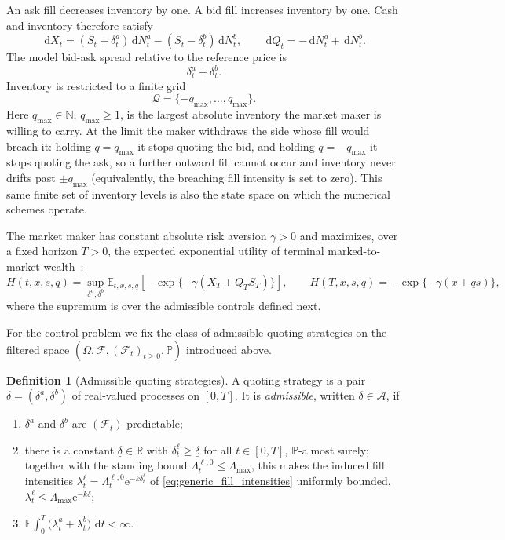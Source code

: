 \documentclass[11pt,a4paper]{article}
\newcommand{\E}{\mathbb{E}}
\newcommand{\Prob}{\mathbb{P}}
\newcommand{\R}{\mathbb{R}}
\newcommand{\Qcal}{\mathcal{Q}}
\newcommand{\Acal}{\mathcal{A}}
\newcommand{\Fcal}{\mathcal{F}}
\newcommand{\dd}{\,\mathrm{d}}
\newcommand{\e}{\mathrm e}
\theoremstyle{plain}
\theoremstyle{definition}
\newtheorem{definition}{Definition}[section]
\begin{document}
An ask fill decreases inventory by one.  A bid fill increases inventory by
one.  Cash and inventory therefore satisfy
\begin{equation}
\dd X_t=(S_t+\delta_t^a)\dd N_t^a
       -(S_t-\delta_t^b)\dd N_t^b,
\qquad
\dd Q_t=-\dd N_t^a+\dd N_t^b .
\label{eq:cash_inventory}
\end{equation}
The model bid-ask spread relative to the reference price is
\[
\delta_t^a + \delta_t^b .
\]
Inventory is restricted to a finite grid
\[
\Qcal=\{-q_{\max},\ldots,q_{\max}\}.
\]
Here \(q_{\max}\in\mathbb N\), \(q_{\max}\ge1\), is the largest absolute
inventory the market maker is willing
to carry. At the limit the maker withdraws the side whose fill would breach
it: holding \(q=q_{\max}\) it stops quoting the bid, and holding
\(q=-q_{\max}\) it stops quoting the ask, so a further outward fill cannot
occur and inventory never drifts past \(\pm q_{\max}\) (equivalently, the
breaching fill intensity is set to zero).  This
same finite set of inventory levels is also the state space on which the
numerical schemes operate.

The market maker has constant absolute risk aversion \(\gamma>0\) and
maximizes, over a fixed horizon \(T>0\), the expected exponential utility of
terminal marked-to-market wealth~\cite{AvellanedaStoikov2008}:
\begin{equation}
H(t,x,s,q)
=
\sup_{\delta^a,\delta^b}
\E_{t,x,s,q}
\left[-\exp\{-\gamma(X_T+Q_TS_T)\}\right],
\qquad
H(T,x,s,q)=-\exp\{-\gamma(x+qs)\},
\label{eq:as_objective}
\end{equation}
where the supremum is over the admissible controls defined next.

For the control problem we fix the class of admissible quoting strategies on
the filtered space \((\Omega,\Fcal,(\Fcal_t)_{t\ge0},\Prob)\) introduced above.

\begin{definition}[Admissible quoting strategies]
\label{def:admissible}
A quoting strategy is a pair \(\delta=(\delta^a,\delta^b)\) of real-valued
processes on \([0,T]\).  It is \emph{admissible}, written \(\delta\in\Acal\), if
\begin{enumerate}[leftmargin=2.4em,itemsep=1pt,topsep=2pt,label=\textup{(A\arabic*)}]
\item \(\delta^a\) and \(\delta^b\) are \((\Fcal_t)\)-predictable;
\item there is a constant \(\underline\delta\in\R\) with
  \(\delta_t^\ell\ge\underline\delta\) for all \(t\in[0,T]\), \(\Prob\)-almost
  surely; together with the standing bound
  \(\Lambda_t^{\ell,0}\le\Lambda_{\max}\), this makes the induced fill
  intensities \(\lambda_t^\ell=\Lambda_t^{\ell,0}\e^{-k\delta_t^\ell}\) of
  \eqref{eq:generic_fill_intensities} uniformly bounded,
  \(\lambda_t^\ell\le\Lambda_{\max}\e^{-k\underline\delta}\);
\item \(\E\!\int_0^T\bigl(\lambda_t^a+\lambda_t^b\bigr)\,\dd t<\infty\).
\end{enumerate}
\end{definition}
\end{document}
